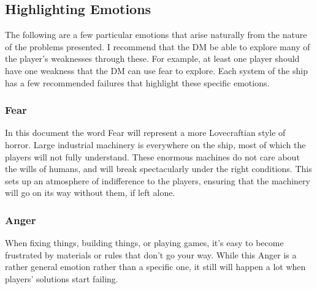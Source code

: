 \documentclass[a4paper]{article}
\begin{document}

\subsection{Highlighting Emotions}

The following are a few particular emotions that arise naturally from the nature of the problems presented. I recommend that the DM be able to explore many of the player's weaknesses through these. For example, at least one player should have one weakness that the DM can use fear to explore. Each system of the ship has a few recommended failures that highlight these specific emotions.

\subsubsection{Fear} \label{fear}

In this document the word Fear will represent a more Lovecraftian style of horror. Large industrial machinery is everywhere on the ship, most of which the players will not fully understand. These enormous machines do not care about the wills of humans, and will break spectacularly under the right conditions. This sets up an atmosphere of indifference to the players, ensuring that the machinery will go on its way without them, if left alone. 

\subsubsection{Anger} \label{anger}

When fixing things, building things, or playing games, it's easy to become frustrated by materials or rules that don't go your way. While this Anger is a rather general emotion rather than a specific one, it still will happen a lot when players' solutions start failing. 
\end{document}
